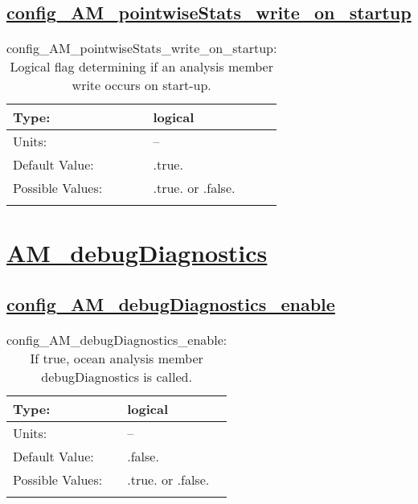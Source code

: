 \subsection[config\_AM\_pointwiseStats\_write\_on\_startup]{\hyperref[sec:nm_tab_AM_pointwiseStats]{config\_AM\_pointwiseStats\_write\_on\_startup}}
\label{subsec:nm_sec_config_AM_pointwiseStats_write_on_startup}
\begin{center}
\begin{longtable}{| p{2.0in} || p{4.0in} |}
    \hline
    Type: & logical \\
    \hline
    Units: & -- \\
    \hline
    Default Value: & .true. \\
    \hline
    Possible Values: & .true. or .false. \\
    \hline
    \caption{config\_AM\_pointwiseStats\_write\_on\_startup: Logical flag determining if an analysis member write occurs on start-up.}
\end{longtable}
\end{center}
\section[AM\_debugDiagnostics]{\hyperref[sec:nm_tab_AM_debugDiagnostics]{AM\_debugDiagnostics}}
\label{sec:nm_sec_AM_debugDiagnostics}
\subsection[config\_AM\_debugDiagnostics\_enable]{\hyperref[sec:nm_tab_AM_debugDiagnostics]{config\_AM\_debugDiagnostics\_enable}}
\label{subsec:nm_sec_config_AM_debugDiagnostics_enable}
\begin{center}
\begin{longtable}{| p{2.0in} || p{4.0in} |}
    \hline
    Type: & logical \\
    \hline
    Units: & -- \\
    \hline
    Default Value: & .false. \\
    \hline
    Possible Values: & .true. or .false. \\
    \hline
    \caption{config\_AM\_debugDiagnostics\_enable: If true, ocean analysis member debugDiagnostics is called.}
\end{longtable}
\end{center}
